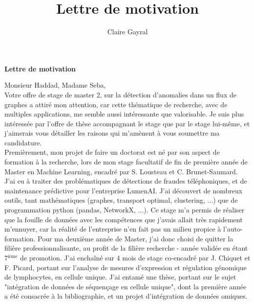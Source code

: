 \documentclass[a4paper,11pt]{article}
\title{Lettre de motivation}
\author{Claire Gayral}
\date{}
\begin{document}
{\centering \Large \bf Lettre de motivation \\ \vspace{0.6cm} }

Monsieur Haddad, Madame Seba,\\

Votre offre de stage de master 2, sur la détection d’anomalies dans un flux de graphes a attiré mon attention, car cette thématique de recherche, avec de multiples applications, me semble aussi intéressante que valorisable. Je suis plus intéressée par l'offre de thèse accompagnant le stage que par le stage lui-même, et j'aimerais vous détailler les raisons qui m'amènent à vous soumettre ma candidature.
\\

Premièrement, mon projet de faire un doctorat est né par son aspect de formation à la recherche, lors de mon stage facultatif de fin de première année de Master en Machine Learning, encadré par S. Lousteau et C. Brunet-Saumard.
J'ai eu à traiter des problématiques de détections de fraudes téléphoniques, et de maintenance prédictive pour l'entreprise LumenAI. J'ai découvert de nombreux outils, tant mathématiques (graphes, transport optimal, clustering, ...) que de programmation python (pandas, NetworkX, ...). 
Ce stage m'a permis de réaliser que la fouille de données avec les compétences que j'avais allait très rapidement m'ennuyer, car la réalité de l'entreprise n'en fait pas un milieu propice à l'auto-formation. 
Pour ma deuxième année de Master, j'ai donc choisi de quitter la filière professionnalisante, au profit de la filière recherche - année validée en étant 7$^{\text{ième}}$ de promotion. 
J'ai enchaîné sur 4 mois de stage co-encadré par J. Chiquet et F. Picard, portant sur l'analyse de mesures d'expression et régulation génomique de lymphocytes, en cellule unique. %
%
%
J'ai entamé une thèse, portant sur le sujet "intégration de données de séquençage en cellule unique", dont la première année a été consacrée à la bibliographie, et un projet d'intégration de données omiques. 
\end{document}
